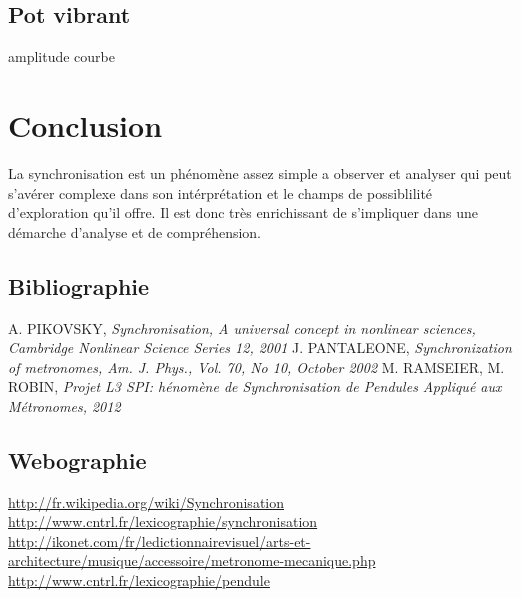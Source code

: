 \documentclass[a4paper,11pt]{report}
\begin{document}
\section{Pot vibrant}

amplitude courbe
\chapter*{Conclusion}
La synchronisation est un phénomène assez simple a observer et analyser qui peut s'avérer complexe dans son intérprétation et le champs de possiblilité d'exploration qu'il offre. Il est donc très enrichissant de s'impliquer dans une démarche d'analyse et de compréhension.
\renewcommand{\bibname}{Références}
\begin{thebibliography}{2}
\section*{Bibliographie}
 A. PIKOVSKY, {\it Synchronisation, A universal concept in nonlinear sciences, Cambridge Nonlinear Science Series 12, 2001}
 J. PANTALEONE, {\it Synchronization of metronomes, Am. J. Phys., Vol. 70, No 10, October 2002}
 M. RAMSEIER, M. ROBIN, {\it Projet L3 SPI: hénomène de Synchronisation de Pendules Appliqué aux Métronomes, 2012}
\section*{Webographie}
 \url{http://fr.wikipedia.org/wiki/Synchronisation}
 \url{http://www.cntrl.fr/lexicographie/synchronisation}
 \url{http://ikonet.com/fr/ledictionnairevisuel/arts-et-architecture/musique/accessoire/metronome-mecanique.php}
 \url{http://www.cntrl.fr/lexicographie/pendule}
\end{thebibliography}
\appendix
\end{document}

